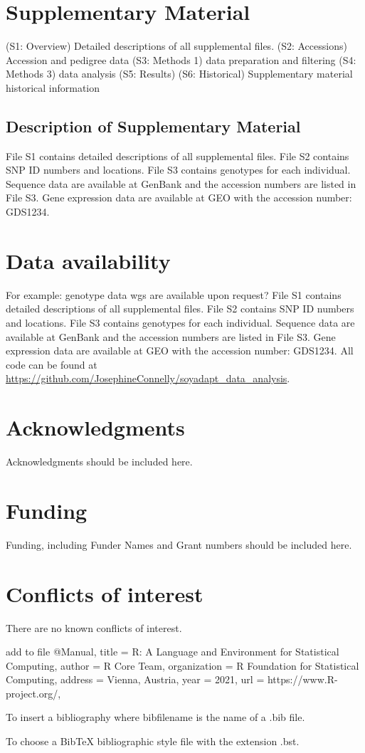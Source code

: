 \documentclass[9pt, twocolumn,twoside]{gsajnl}
\begin{document}
\section{Supplementary Material}
\label{sec:supplementary:material}

(S1: Overview) Detailed descriptions of all supplemental files. 
(S2: Accessions) Accession and pedigree data 
(S3: Methods 1) data preparation and filtering 
(S4: Methods 3) data analysis
(S5: Results)
(S6: Historical) Supplementary material historical information 

\subsection{Description of Supplementary Material}
File S1 contains detailed descriptions of all supplemental files. 
File S2 contains SNP ID numbers and locations. File S3 contains genotypes for each individual. Sequence data are available at GenBank and the accession numbers are listed in File S3. Gene expression data are available at GEO with the accession number: GDS1234. 

\section{Data availability}
\label{sec:data:availability}
For example: genotype data wgs are available upon request? 
File S1 contains detailed descriptions of all supplemental files. File S2 contains SNP ID numbers and locations. File S3 contains genotypes for each individual. Sequence data are available at GenBank and the accession numbers are listed in File S3. Gene expression data are available at GEO with the accession number: GDS1234. 
All code can be found at \url{https://github.com/JosephineConnelly/soyadapt_data_analysis}.

\section{Acknowledgments}
Acknowledgments should be included here.

\section{Funding}
Funding, including Funder Names and Grant numbers should be included here.

\section{Conflicts of interest}
There are  no known conflicts of interest.

add to file 
   @Manual{,
     title = {R: A Language and Environment for Statistical Computing},
     author = {{R Core Team}},
     organization = {R Foundation for Statistical Computing},
     address = {Vienna, Austria},
     year = {2021},
     url = {https://www.R-project.org/},
     }



    To insert a bibliography where bibfilename is the name of a .bib file.



        To choose a BibTeX bibliographic style file with the extension .bst.
\end{document}
